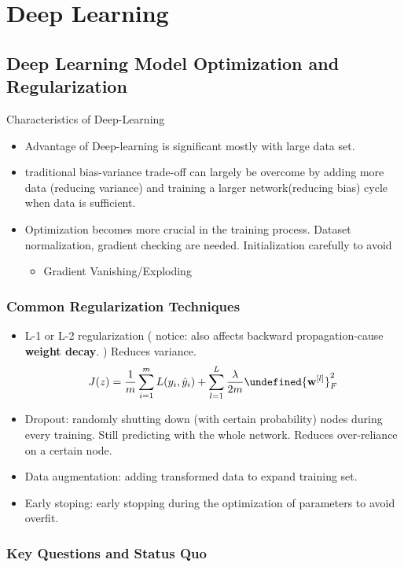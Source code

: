 \documentclass[11pt, openany]{book}              %
\let\norm\undefined %
\DeclarePairedDelimiter\norm{\lVert}{\rVert}
\begin{document}
\part{Deep Learning}

\chapter{Deep Learning Model Optimization and Regularization}

Characteristics of Deep-Learning

\begin{itemize}
    \item Advantage of Deep-learning is significant mostly with large data set.
    \item traditional bias-variance trade-off can largely be overcome by adding more data (reducing variance) and training a larger network(reducing bias) cycle when data is sufficient.
    \item Optimization becomes more crucial in the training process. Dataset normalization, gradient checking are needed. Initialization carefully to avoid 
    \begin{itemize}
    	\item Gradient Vanishing/Exploding	
    \end{itemize}
\end{itemize}

\section{Common Regularization Techniques}

\begin{itemize}
    \item L-1 or L-2 regularization ( notice: also affects backward propagation-cause 
\textbf{weight decay}. ) Reduces variance.
	$$J(z) = \frac{1}{m} \sum_{i=1}^m L(y_i,\hat{y}_i) + \sum_{l=1}^L\frac{\lambda}{2m}\norm{\mathbf{w}^{[l]}}^2_F$$
   \item Dropout: randomly shutting down (with certain probability) nodes during every training. Still predicting with the whole network. Reduces over-reliance on a certain node.
  \item Data augmentation: adding transformed data to expand training set.
 \item Early stoping: early stopping during the optimization of parameters to avoid overfit.
\end{itemize}

\section{Key Questions and Status Quo}
\end{document}
